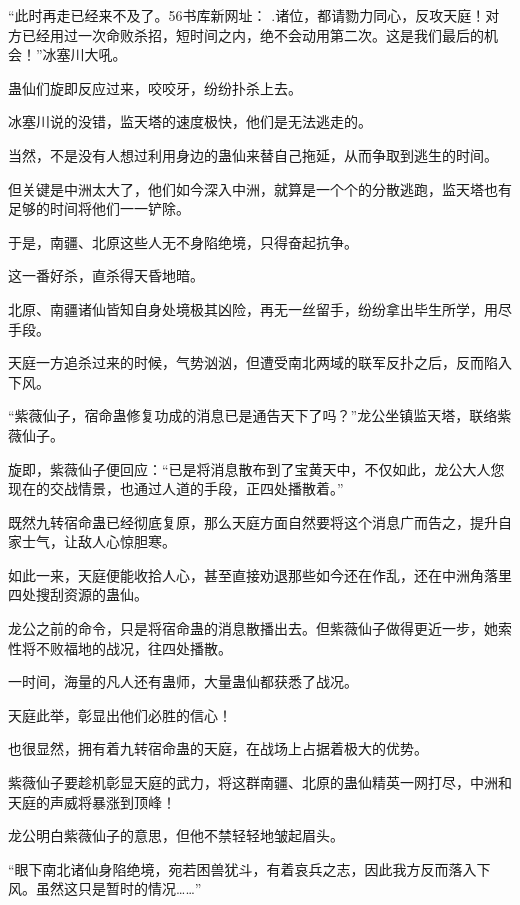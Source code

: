 
\begin{this_body}

“此时再走已经来不及了。56书库新网址： .诸位，都请勠力同心，反攻天庭！对方已经用过一次命败杀招，短时间之内，绝不会动用第二次。这是我们最后的机会！”冰塞川大吼。

蛊仙们旋即反应过来，咬咬牙，纷纷扑杀上去。

冰塞川说的没错，监天塔的速度极快，他们是无法逃走的。

当然，不是没有人想过利用身边的蛊仙来替自己拖延，从而争取到逃生的时间。

但关键是中洲太大了，他们如今深入中洲，就算是一个个的分散逃跑，监天塔也有足够的时间将他们一一铲除。

于是，南疆、北原这些人无不身陷绝境，只得奋起抗争。

这一番好杀，直杀得天昏地暗。

北原、南疆诸仙皆知自身处境极其凶险，再无一丝留手，纷纷拿出毕生所学，用尽手段。

天庭一方追杀过来的时候，气势汹汹，但遭受南北两域的联军反扑之后，反而陷入下风。

“紫薇仙子，宿命蛊修复功成的消息已是通告天下了吗？”龙公坐镇监天塔，联络紫薇仙子。

旋即，紫薇仙子便回应：“已是将消息散布到了宝黄天中，不仅如此，龙公大人您现在的交战情景，也通过人道的手段，正四处播散着。”

既然九转宿命蛊已经彻底复原，那么天庭方面自然要将这个消息广而告之，提升自家士气，让敌人心惊胆寒。

如此一来，天庭便能收拾人心，甚至直接劝退那些如今还在作乱，还在中洲角落里四处搜刮资源的蛊仙。

龙公之前的命令，只是将宿命蛊的消息散播出去。但紫薇仙子做得更近一步，她索性将不败福地的战况，往四处播散。

一时间，海量的凡人还有蛊师，大量蛊仙都获悉了战况。

天庭此举，彰显出他们必胜的信心！

也很显然，拥有着九转宿命蛊的天庭，在战场上占据着极大的优势。

紫薇仙子要趁机彰显天庭的武力，将这群南疆、北原的蛊仙精英一网打尽，中洲和天庭的声威将暴涨到顶峰！

龙公明白紫薇仙子的意思，但他不禁轻轻地皱起眉头。

“眼下南北诸仙身陷绝境，宛若困兽犹斗，有着哀兵之志，因此我方反而落入下风。虽然这只是暂时的情况……”


\end{this_body}

